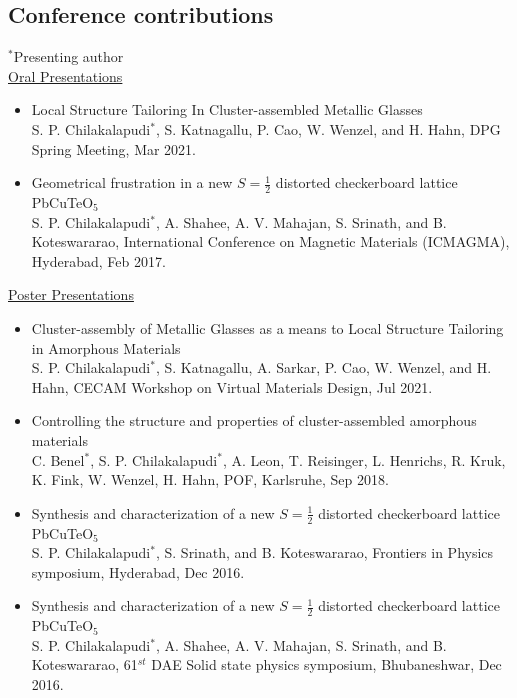 \subsection*{Conference contributions}
$^*$Presenting author \\

\underline{Oral Presentations}
\begin{itemize}%
	\item \textsf{Local Structure Tailoring In \cz Cluster-assembled Metallic Glasses}\\
	S. P. Chilakalapudi$^*$, S. Katnagallu, P. Cao, W. Wenzel, and H. Hahn, DPG Spring Meeting, Mar 2021.
	
	\item \textsf{Geometrical frustration in a new $S=\frac{1}{2}$ distorted checkerboard lattice PbCuTeO$_5$}\\
	S. P. Chilakalapudi$^*$, A. Shahee, A. V. Mahajan, S. Srinath, and B. Koteswararao, International Conference on Magnetic Materials (ICMAGMA), Hyderabad, Feb 2017.
\end{itemize}

\underline{Poster Presentations}
\begin{itemize}%
	\item \textsf{Cluster-assembly of Metallic Glasses as a means to Local Structure Tailoring in Amorphous Materials}\\
	S. P. Chilakalapudi$^*$, S. Katnagallu, A. Sarkar, P. Cao, W. Wenzel, and H. Hahn, CECAM Workshop on Virtual Materials Design, Jul 2021.
	
	\item \textsf{Controlling the structure and properties of cluster-assembled amorphous materials} \\
	C. Benel$^*$, S. P. Chilakalapudi$^*$, A. Leon, T. Reisinger, L. Henrichs, R. Kruk, K. Fink, W. Wenzel, H. Hahn, POF, Karlsruhe, Sep 2018.
	
	\item \textsf{Synthesis and characterization of a new $S=\frac{1}{2}$ distorted checkerboard lattice PbCuTeO$_5$}\\
	S. P. Chilakalapudi$^*$, S. Srinath, and B. Koteswararao, Frontiers in Physics symposium, Hyderabad, Dec 2016.
	
	\item \textsf{Synthesis and characterization of a new $S=\frac{1}{2}$ distorted checkerboard lattice PbCuTeO$_5$}\\
	S. P. Chilakalapudi$^*$, A. Shahee, A. V. Mahajan, S. Srinath, and B. Koteswararao, 61$^{st}$ DAE Solid state physics symposium, Bhubaneshwar, Dec 2016.
\end{itemize}

